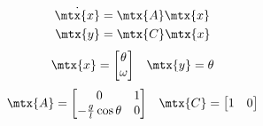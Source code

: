 \begin{theorem}
  \begin{align*}
    \dot{\mtx{x}} &= \mtx{A} \mtx{x} \\
    \mtx{y} &= \mtx{C} \mtx{x}
  \end{align*}
  \begin{equation*}
    \begin{array}{ccc}
      \mtx{x} =
      \begin{bmatrix}
        \theta \\
        \omega
      \end{bmatrix} &
      \mtx{y} = \theta
    \end{array}
  \end{equation*}
  \begin{equation}
    \begin{array}{cccc}
      \mtx{A} =
      \begin{bmatrix}
        0 & 1 \\
        -\frac{g}{l}\cos\theta & 0
      \end{bmatrix} &
      \mtx{C} =
      \begin{bmatrix}
        1 & 0
      \end{bmatrix}
    \end{array}
  \end{equation}
\end{theorem}
